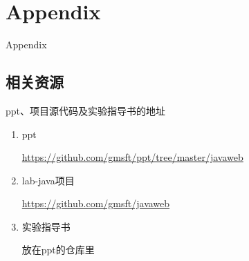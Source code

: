 \documentclass{beamer}
\begin{document}
\section{Appendix}

\begin{frame}
\Huge{\centerline{Appendix}}
\end{frame}

\subsection{相关资源}
\begin{frame}
\begin{block}{ppt、项目源代码及实验指导书的地址}
\begin{enumerate}
\item
ppt

\url{https://github.com/gmsft/ppt/tree/master/javaweb}
\item
lab-java项目

\url{https://github.com/gmsft/javaweb}

\item
实验指导书

放在ppt的仓库里
\end{enumerate}
\end{block}
\end{frame}



\end{document}
